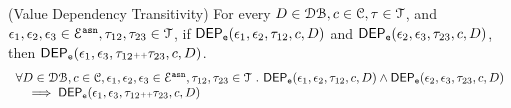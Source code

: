 %
%
%
%
\begin{lem}
	\label{lem:valdep_trans}
(Value Dependency Transitivity)
For every $D \in \dbdom , c \in \cdom, \trace \in \mathcal{T}$, and $\event_1, \event_2, \event_3 \in \eventset^{\asn}, \trace_{12}, \trace_{23} \in \mathcal{T}$,
if $\eventdep(\event_1, \event_2, \trace_{12}, c, D)$
and $\eventdep(\event_2, \event_3, \trace_{23}, c, D) $,
then $\eventdep(\event_1, \event_3, \trace_{12}\tracecat\trace_{23}, c, D)$.
  \[
	  \begin{array}{l}
  \forall D \in \dbdom , c \in \cdom, \event_1, \event_2, \event_3 \in \eventset^{\asn}, \trace_{12}, \trace_{23} \in \mathcal{T} \st 
  \eventdep(\event_1, \event_2, \trace_{12}, c, D) 
  \land
  \eventdep(\event_2, \event_3, \trace_{23}, c, D) 
  \\ \quad
  \implies
  \eventdep(\event_1, \event_3, \trace_{12}\tracecat\trace_{23}, c, D)
	  \end{array}
  \]
\end{lem}
